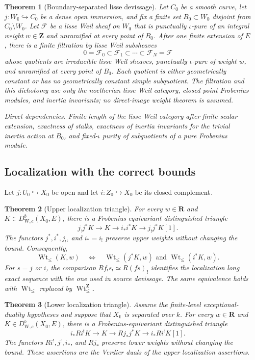 \documentclass[10pt]{article}
\newtheorem{theorem}{Theorem}[section]
\theoremstyle{definition}
\newcommand{\DW}{D^b_{\mathrm W,c}}
\newcommand{\WtLe}{\operatorname{Wt}_{\leq}}
\newcommand{\IntWtLe}{\operatorname{Wt}^{\mathbf Z}_{\leq}}
\newcommand{\dep}[1]{\par\smallskip\noindent\textit{Direct dependencies.} #1\par}
\begin{document}
\begin{theorem}[Boundary-separated lisse devissage]
Let \(C_0\) be a smooth curve, let \(j:W_0\hookrightarrow C_0\) be a dense
open immersion, and fix a finite set \(B_0\subset W_0\) disjoint from
\(C_0\setminus W_0\).  Let \(\mathcal F\) be a lisse Weil sheaf on \(W_0\)
that is punctually \(\iota\)-pure of an integral weight
\(w\in\mathbf Z\) and unramified at every point of \(B_0\).  After one
finite extension of \(E\), there is a finite filtration by lisse Weil
subsheaves
\[
 0=\mathcal F_0\subset\mathcal F_1\subset\cdots\subset
 \mathcal F_N=\mathcal F
\]
whose quotients are irreducible lisse Weil sheaves, punctually
\(\iota\)-pure of weight \(w\), and unramified at every point of \(B_0\).
Each quotient is either geometrically constant or has no geometrically
constant simple subquotient.  The filtration and this dichotomy use only
the noetherian lisse Weil category, closed-point Frobenius modules, and
inertia invariants; no direct-image weight theorem is assumed.
\dep{Finite length of the lisse Weil category after finite scalar
extension, exactness of stalks, exactness of inertia invariants for the
trivial inertia action at \(B_0\), and fixed-\(\iota\) purity of
subquotients of a pure Frobenius module.}
\end{theorem}

\subsection{Localization with the correct bounds}

Let \(j:U_0\hookrightarrow X_0\) be open and let
\(i:Z_0\hookrightarrow X_0\) be its closed complement.

\begin{theorem}[Upper localization triangle]
For every \(w\in\mathbf R\) and \(K\in\DW(X_0,E)\), there is a
Frobenius-equivariant distinguished
triangle
\[
 j_!j^*K\longrightarrow K\longrightarrow i_*i^*K
                  \longrightarrow j_!j^*K[1].
\]
The functors \(j^*,i^*,j_!\), and \(i_*=i_!\) preserve upper weights without
changing the bound.  Consequently,
\[
 \WtLe(K,w)\quad\Longleftrightarrow\quad
 \WtLe(j^*K,w)\text{ and }\WtLe(i^*K,w).
\]
For \(s=j\) or \(i\), the comparison
\(Rf_!s_!\simeq R(fs)_!\) identifies the localization long exact sequence
with the one used in source devissage.
The same equivalence holds with \(\WtLe\) replaced by \(\IntWtLe\).
\end{theorem}

\begin{theorem}[Lower localization triangle]
Assume the finite-level exceptional-duality hypotheses and suppose that
\(X_0\) is separated over \(k\).  For every \(w\in\mathbf R\) and
\(K\in\DW(X_0,E)\), there is a Frobenius-equivariant
distinguished triangle
\[
 i_*Ri^!K\longrightarrow K\longrightarrow Rj_*j^*K
                  \longrightarrow i_*Ri^!K[1].
\]
The functors \(Ri^!,j^!,i_*\), and \(Rj_*\) preserve lower weights without
changing the bound.  These assertions are the Verdier duals of the upper
localization assertions.
\end{theorem}
\end{document}
